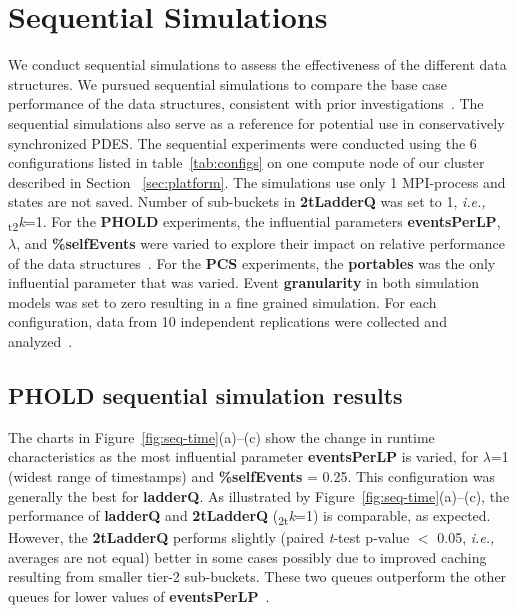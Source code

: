 \section{ Sequential Simulations}\label{sec:seq}

We conduct sequential simulations to assess the effectiveness of the different data structures. We pursued sequential simulations to compare the base case performance of the data structures, consistent with prior investigations~\cite{tang-05,franceschini-15}. The sequential simulations also serve as a reference for potential use in conservatively synchronized PDES. The sequential experiments were conducted using the 6 configurations listed in table~\ref{tab:configs} on one compute node of our cluster described in Section ~\ref{sec:platform}. The simulations use only 1 MPI-process and states are not saved. Number of sub-buckets in \textbf{2tLadderQ} was set to 1, \textit{i.e.,} \textsubscript{t2}\textit{k}=1. For the \textbf{PHOLD} experiments, the influential parameters \textbf{eventsPerLP}, $\lambda$, and \textbf{\%selfEvents} were varied to explore their impact on relative performance of the data structures~\cite{higiro2017multi}. For the \textbf{PCS} experiments, the \textbf{portables} was the only influential parameter that was varied. Event \textbf{granularity} in both simulation models was set to zero resulting in a fine grained simulation. For each configuration, data from 10 independent replications were collected and analyzed~\cite{higiro2017multi}.

\subsection{PHOLD sequential simulation results}\label{sec:seq-phold}

The charts in Figure~\ref{fig:seq-time}(a)--(c) show the change in runtime characteristics as the most influential parameter \textbf{eventsPerLP} is varied, for $\lambda$=1 (widest range of timestamps) and \textbf{\%self}\-\textbf{Events} = 0.25. This configuration was generally the best for \textbf{ladderQ}. As illustrated by Figure~\ref{fig:seq-time}(a)--(c), the performance of \textbf{ladderQ} and \textbf{2tLadderQ} (\textsubscript{2t}\textit{k}=1) is comparable, as expected. However, the \textbf{2tLadderQ} performs slightly (paired \emph{t}-test p-value $<$ 0.05, \textit{i.e.,} averages are not equal) better in some cases possibly due to improved caching resulting from smaller tier-2 sub-buckets. These two queues outperform the other queues for lower values of \textbf{eventsPerLP}~\cite{higiro2017multi}.

